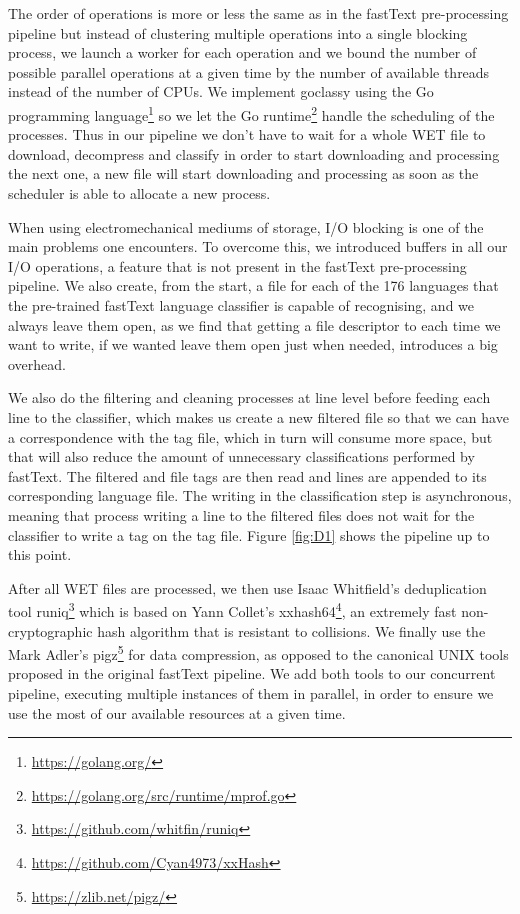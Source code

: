 The order of operations is more or less the same as in the fastText pre-processing pipeline but instead of clustering multiple operations into a single blocking process, we launch a worker for each operation and we bound the number of possible parallel operations at a given time by the number of available threads instead of the number of CPUs. We implement goclassy using the Go programming language\footnote{\url{https://golang.org/}} so we let the Go runtime\footnote{\url{https://golang.org/src/runtime/mprof.go}} handle the scheduling of the processes. Thus in our pipeline we don't have to wait for a whole WET file to download, decompress and classify in order to start downloading and processing the next one, a new file will start downloading and processing as soon as the scheduler is able to allocate a new process.

When using electromechanical mediums of storage, I/O blocking is one of the main problems one encounters. To overcome this, we introduced buffers in all our I/O operations, a feature that is not present in the fastText pre-processing pipeline. We also create, from the start, a file for each of the 176 languages that the pre-trained fastText language classifier is capable of recognising, and we always leave them open, as we find that getting a file descriptor to each time we want to write, if we wanted leave them open just when needed, introduces a big overhead.

We also do the filtering and cleaning processes at line level before feeding each line to the classifier, which makes us create a new filtered file so that we can have a correspondence with the tag file, which in turn will consume more space, but that will also reduce the amount of unnecessary classifications performed by fastText. The filtered and file tags are then read and lines are appended to its corresponding language file. The writing in the classification step is asynchronous, meaning that process writing a line to the filtered files does not wait for the classifier to write a tag on the tag file. Figure \ref{fig:D1} shows the pipeline up to this point.

After all WET files are processed, we then use Isaac Whitfield's deduplication tool runiq\footnote{\url{https://github.com/whitfin/runiq}} which is based on Yann Collet's xxhash64\footnote{\url{https://github.com/Cyan4973/xxHash}}, an extremely fast non-cryptographic hash algorithm that is resistant to collisions. We finally use the Mark Adler's pigz\footnote{\url{https://zlib.net/pigz/}} for data compression, as opposed to the canonical UNIX tools proposed in the original fastText pipeline. We add both tools to our concurrent pipeline, executing multiple instances of them in parallel, in order to ensure we use the most of our available resources at a given time.

